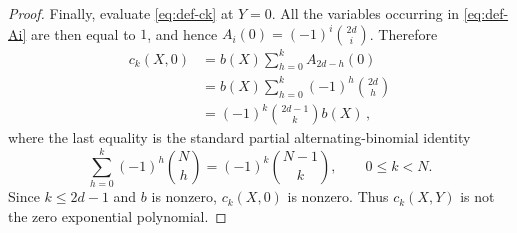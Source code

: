 \documentclass[10pt,a4paper]{amsart}
\begin{document}
\begin{proof}
Finally, evaluate \eqref{eq:def-ck} at $Y=0$. All the variables occurring
in \eqref{eq:def-Ai} are then equal to $1$, and hence
\(A_i(0)=(-1)^i\binom{2d}{i}\).
Therefore
\begin{align*}
    c_k(X,0)
    &=b(X)\sum_{h=0}^{k}A_{2d-h}(0)\\
    &=b(X)\sum_{h=0}^{k}(-1)^h\binom{2d}{h}\\
    &=(-1)^k\binom{2d-1}{k}b(X)\, ,
\end{align*}
where the last equality is the standard partial alternating-binomial
identity
\[
    \sum_{h=0}^{k}(-1)^h\binom{N}{h}
    =(-1)^k\binom{N-1}{k},
    \qquad 0\leq k<N.
\]
Since $k\leq 2d-1$ and $b$ is nonzero, $c_k(X,0)$ is nonzero. Thus
$c_k(X,Y)$ is not the zero exponential polynomial.
\end{proof}
\end{document}
